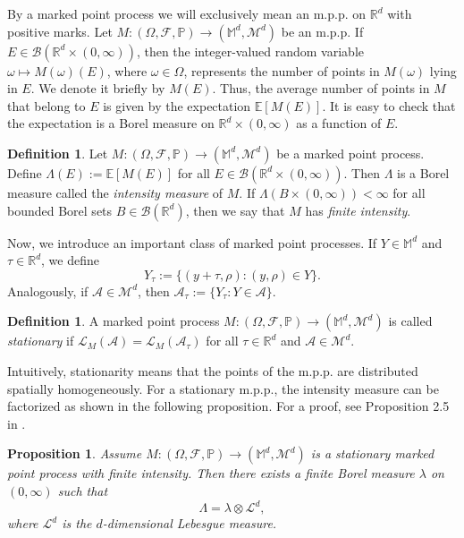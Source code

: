 \documentclass{article}
\numberwithin{equation}{section}
\newtheorem{proposition}[theorem]{Proposition}
\theoremstyle{definition}
\newtheorem{definition}[theorem]{Definition}
\theoremstyle{remark}
\begin{document}
By a marked point process we will exclusively mean an m.p.p. on $\mathbb{R}^d$ with positive marks. Let $M : (\Omega, \mathcal{F}, \mathbb{P}) \rightarrow (\mathbb{M}^d, \mathcal{M}^d)$ be an m.p.p. If $E \in \mathcal{B}(\mathbb{R}^d \times (0, \infty))$, then the integer-valued random variable $\omega \mapsto M(\omega)(E)$, where $\omega \in \Omega$, represents the number of points in $M(\omega)$ lying in $E$. We denote it briefly by $M(E)$. Thus, the average number of points in $M$ that belong to $E$ is given by the expectation $\mathbb{E}[M(E)]$. It is easy to check that the expectation is a Borel measure on $\mathbb{R}^d \times (0, \infty)$ as a function of $E$.

\begin{definition}
    Let $M : (\Omega, \mathcal{F}, \mathbb{P}) \rightarrow (\mathbb{M}^d, \mathcal{M}^d)$ be a marked point process. Define $\Lambda(E) := \mathbb{E}[M(E)]$ for all $E \in \mathcal{B}(\mathbb{R}^d \times (0, \infty))$. Then $\Lambda$ is a Borel measure called the \textit{intensity measure} of $M$. If $\Lambda(B \times (0, \infty)) < \infty$ for all bounded Borel sets $B \in \mathcal{B}(\mathbb{R}^d)$, then we say that $M$ has \textit{finite intensity}.
\end{definition}

Now, we introduce an important class of marked point processes. If $Y \in \mathbb{M}^d$ and $\tau \in \mathbb{R}^d$, we define
\[
Y_\tau := \{(y + \tau, \rho) : (y, \rho) \in Y\}.
\]
Analogously, if $\mathcal{A} \in \mathcal{M}^d$, then $\mathcal{A}_\tau := \{Y_\tau : Y \in \mathcal{A}\}$.

\begin{definition}
    A marked point process $M : (\Omega, \mathcal{F}, \mathbb{P}) \rightarrow (\mathbb{M}^d, \mathcal{M}^d)$ is called \textit{stationary} if $\mathcal{L}_M(\mathcal{A}) = \mathcal{L}_M(\mathcal{A}_\tau)$ for all $\tau \in \mathbb{R}^d$ and $\mathcal{A} \in \mathcal{M}^d$.
\end{definition}

Intuitively, stationarity means that the points of the m.p.p. are distributed spatially homogeneously. For a stationary m.p.p., the intensity measure can be factorized as shown in the following proposition. For a proof, see Proposition 2.5 in \cite{B}.

\begin{proposition} \label{pr:intensity_measure_stationary}
    Assume $M : (\Omega, \mathcal{F}, \mathbb{P}) \rightarrow (\mathbb{M}^d, \mathcal{M}^d)$ is a stationary marked point process with finite intensity. Then there exists a finite Borel measure $\lambda$ on $(0, \infty)$ such that
    \begin{equation} \label{eq:intensity_measure_splits}
        \Lambda =  \lambda \otimes \mathcal{L}^d,
    \end{equation}
    where $\mathcal{L}^d$ is the $d$-dimensional Lebesgue measure.
\end{proposition}
\end{document}

